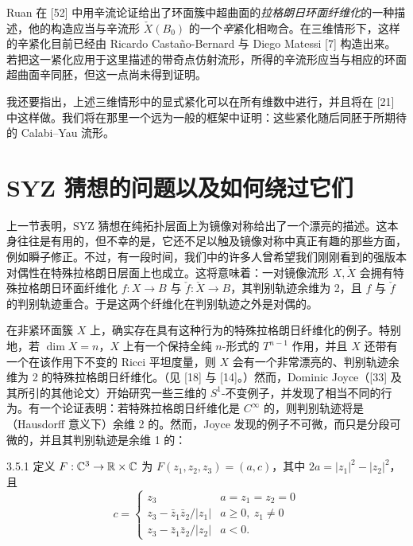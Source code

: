 
Ruan 在 [52] 中用辛流论证给出了环面簇中超曲面的\emph{拉格朗日环面纤维化}的一种描述，他的构造应当与辛流形 $\check X(B_0)$ 的一个\emph{辛}紧化相吻合。在三维情形下，这样的辛紧化目前已经由 Ricardo Castaño-Bernard 与 Diego Matessi [7] 构造出来。若把这一紧化应用于这里描述的带奇点仿射流形，所得的辛流形应当与相应的环面超曲面辛同胚，但这一点尚未得到证明。

我还要指出，上述三维情形中的显式紧化可以在所有维数中进行，并且将在 [21] 中这样做。我们将在那里一个远为一般的框架中证明：这些紧化随后同胚于所期待的 Calabi--Yau 流形。

\section{SYZ 猜想的问题以及如何绕过它们}

上一节表明，SYZ 猜想在纯拓扑层面上为镜像对称给出了一个漂亮的描述。这本身往往是有用的，但不幸的是，它还不足以触及镜像对称中真正有趣的那些方面，例如瞬子修正。不过，有一段时间，我们中的许多人曾希望我们刚刚看到的强版本对偶性在特殊拉格朗日层面上也成立。这将意味着：一对镜像流形 $X,\check X$ 会拥有特殊拉格朗日环面纤维化 $f:X\to B$ 与 $\check f:\check X\to B$，其判别轨迹余维为 2，且 $f$ 与 $\check f$ 的判别轨迹重合。于是这两个纤维化在判别轨迹之外是对偶的。

在非紧环面簇 $X$ 上，确实存在具有这种行为的特殊拉格朗日纤维化的例子。特别地，若 $\dim X=n$，$X$ 上有一个保持全纯 $n$-形式的 $T^{n-1}$ 作用，并且 $X$ 还带有一个在该作用下不变的 Ricci 平坦度量，则 $X$ 会有一个非常漂亮的、判别轨迹余维为 2 的特殊拉格朗日纤维化。（见 [18] 与 [14]。）然而，Dominic Joyce（[33] 及其所引的其他论文）开始研究一些三维的 $S^1$-不变例子，并发现了相当不同的行为。有一个论证表明：若特殊拉格朗日纤维化是 $C^\infty$ 的，则判别轨迹将是（Hausdorff 意义下）余维 2 的。然而，Joyce 发现的例子不可微，而只是分段可微的，并且其判别轨迹是余维 1 的：

\begin{example}{3.5.1}
定义 $F:\mathbb{C}^3\to\mathbb{R}\times\mathbb{C}$ 为 $F(z_1,z_2,z_3)=(a,c)$，其中 $2a=|z_1|^2-|z_2|^2$，且
\[
c=\begin{cases}
z_3 & a=z_1=z_2=0\\
z_3-\bar z_1\bar z_2/|z_1| & a\ge0,\ z_1\ne0\\
z_3-\bar z_1\bar z_2/|z_2| & a<0.
\end{cases}
\]
\end{example}

